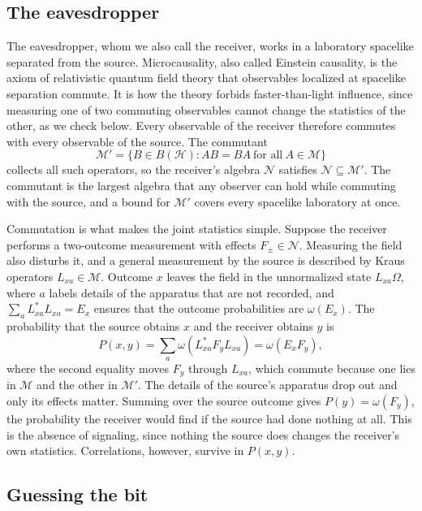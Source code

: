 \documentclass[11pt,a4paper]{article}
\newcommand{\M}{\mathcal M}
\newcommand{\N}{\mathcal N}
\begin{document}
\subsection{The eavesdropper}

The eavesdropper, whom we also call the receiver, works in a laboratory spacelike separated from the source. Microcausality, also called Einstein causality, is the axiom of relativistic quantum field theory that observables localized at spacelike separation commute. It is how the theory forbids faster-than-light influence, since measuring one of two commuting observables cannot change the statistics of the other, as we check below. Every observable of the receiver therefore commutes with every observable of the source. The commutant
\begin{equation*}
 \M'=\{B\in B(\mathcal H):AB=BA\ \text{for all}\ A\in\M\}
\end{equation*}
collects all such operators, so the receiver's algebra $\N$ satisfies $\N\subseteq\M'$. The commutant is the largest algebra that any observer can hold while commuting with the source, and a bound for $\M'$ covers every spacelike laboratory at once.

Commutation is what makes the joint statistics simple. Suppose the receiver performs a two-outcome measurement with effects $F_\pm\in\N$. Measuring the field also disturbs it, and a general measurement by the source is described by Kraus operators $L_{xa}\in\M$. Outcome $x$ leaves the field in the unnormalized state $L_{xa}\Omega$, where $a$ labels details of the apparatus that are not recorded, and $\sum_aL_{xa}^*L_{xa}=E_x$ ensures that the outcome probabilities are $\omega(E_x)$. The probability that the source obtains $x$ and the receiver obtains $y$ is
\begin{equation}
 P(x,y)=\sum_a\omega(L_{xa}^*F_yL_{xa})=\omega(E_xF_y),
 \label{eq:conditional}
\end{equation}
where the second equality moves $F_y$ through $L_{xa}$, which commute because one lies in $\M$ and the other in $\M'$. The details of the source's apparatus drop out and only its effects matter. Summing over the source outcome gives $P(y)=\omega(F_y)$, the probability the receiver would find if the source had done nothing at all. This is the absence of signaling, since nothing the source does changes the receiver's own statistics. Correlations, however, survive in $P(x,y)$.

\subsection{Guessing the bit}
\end{document}
